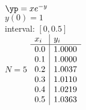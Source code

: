 {
$\yp = xe^{-y}$\\
$y(0)=1$\\
interval: $[0,0.5]$\\
$N=5$
}
{
	$\begin{array}{l | l}
		x_i & y_i    \\ \hline
		0.0 & 1.0000 \\
		0.1 & 1.0000 \\
		0.2 & 1.0037 \\
		0.3 & 1.0110 \\
		0.4 & 1.0219 \\
		0.5 & 1.0363
	\end{array}$
}